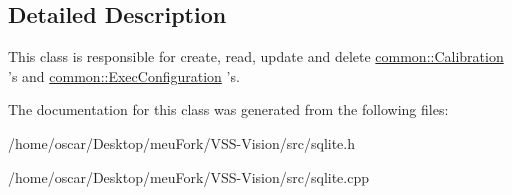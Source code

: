 \subsection{Detailed Description}
This class is responsible for create, read, update and delete \hyperlink{structcommon_1_1Calibration}{common\-::\-Calibration} 's and \hyperlink{structcommon_1_1ExecConfiguration}{common\-::\-Exec\-Configuration} 's. 

The documentation for this class was generated from the following files\-:\begin{DoxyCompactItemize}
\item 
/home/oscar/\-Desktop/meu\-Fork/\-V\-S\-S-\/\-Vision/src/sqlite.\-h\item 
/home/oscar/\-Desktop/meu\-Fork/\-V\-S\-S-\/\-Vision/src/sqlite.\-cpp\end{DoxyCompactItemize}
